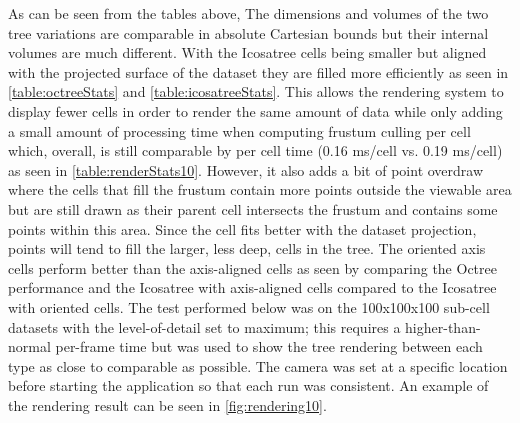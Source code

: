 As can be seen from the tables above, The dimensions and volumes of the two tree
variations are comparable in absolute Cartesian bounds but their internal
volumes are much different. With the Icosatree cells being smaller but aligned
with the projected surface of the dataset they are filled more efficiently as
seen in \ref{table:octreeStats} and \ref{table:icosatreeStats}. This allows the
rendering system to display fewer cells in order to render the same amount of
data while only adding a small amount of processing time when computing frustum
culling per cell which, overall, is still comparable by per cell time (0.16
ms/cell vs. 0.19 ms/cell) as seen in \ref{table:renderStats10}. However, it also
adds a bit of point overdraw where the cells that fill the frustum contain more
points outside the viewable area but are still drawn as their parent cell
intersects the frustum and contains some points within this area. Since the cell
fits better with the dataset projection, points will tend to fill the larger,
less deep, cells in the tree. The oriented axis cells perform better than the
axis-aligned cells as seen by comparing the Octree performance and the Icosatree
with axis-aligned cells compared to the Icosatree with oriented cells. The test
performed below was on the 100x100x100 sub-cell datasets with the
level-of-detail set to maximum; this requires a higher-than-normal per-frame
time but was used to show the tree rendering between each type as close to
comparable as possible. The camera was set at a specific location before
starting the application so that each run was consistent. An example of the
rendering result can be seen in \ref{fig:rendering10}.

\begin{table}[htp]
\caption{Rendering Statistics}
\label{table:renderStats10}
\end{table}

